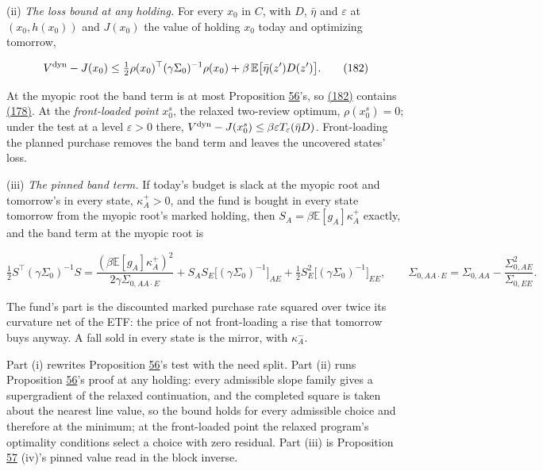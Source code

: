 \documentclass[11pt]{article}
\begin{document}
(ii) \emph{The loss bound at any holding.} For every \(x_0\) in \(C\), with \(D\), \(\bar\eta\) and
\(\varepsilon\) at \((x_0,h(x_0))\) and \(J(x_0)\) the value of holding \(x_0\) today and
optimizing tomorrow,

\begin{equation*}
V^{\rm dyn}-J(x_0)\leq\tfrac12\rho(x_0)^\top(\gamma\Sigma_0)^{-1}\rho(x_0)+\beta\,\mathbb E\bigl[\bar\eta(z')D(z')\bigr].\tag{182}\label{eq:182}
\end{equation*}

At the myopic root the band term is at most Proposition \hyperref[res:Proposition-56]{56}'s, so \hyperref[eq:182]{(182)}
contains \hyperref[eq:178]{(178)}. At the \emph{front-loaded point} \(x^s_0\), the relaxed two-review
optimum, \(\rho(x^s_0)=0\); under the test at a level \(\varepsilon>0\) there,
\(V^{\rm dyn}-J(x^s_0)\leq\beta\varepsilon T_\varepsilon(\bar\eta D)\). Front-loading the planned purchase removes
the band term and leaves the uncovered states' loss.

(iii) \emph{The pinned band term.} If today's budget is slack at the myopic
root and tomorrow's in every state, \(\kappa^+_A>0\), and the fund is bought in
every state tomorrow from the myopic root's marked holding, then
\(S_A=\beta\mathbb E[g_A]\kappa^+_A\) exactly, and the band term at the myopic root is

\begin{equation*}
\tfrac12S^\top(\gamma\Sigma_0)^{-1}S=\frac{(\beta\mathbb E[g_A]\kappa^+_A)^2}{2\gamma\Sigma_{0,AA\cdot E}}+S_AS_E\bigl[(\gamma\Sigma_0)^{-1}\bigr]_{AE}+\tfrac12S_E^2\bigl[(\gamma\Sigma_0)^{-1}\bigr]_{EE},\qquad
\Sigma_{0,AA\cdot E}=\Sigma_{0,AA}-\frac{\Sigma_{0,AE}^2}{\Sigma_{0,EE}}.\tag{183}\label{eq:183}
\end{equation*}

The fund's part is the discounted marked purchase rate squared over
twice its curvature net of the ETF: the price of not front-loading a
rise that tomorrow buys anyway. A fall sold in every state is the
mirror, with \(\kappa^-_A\).

Part (i) rewrites Proposition \hyperref[res:Proposition-56]{56}'s test with the need split. Part (ii)
runs Proposition \hyperref[res:Proposition-56]{56}'s proof at any holding: every admissible slope
family gives a supergradient of the relaxed continuation, and the
completed square is taken about the nearest line value, so the bound
holds for every admissible choice and therefore at the minimum; at the
front-loaded point the relaxed program's optimality conditions select a
choice with zero residual. Part (iii) is Proposition \hyperref[res:Proposition-57]{57} (iv)'s pinned
value read in the block inverse.
\end{document}
